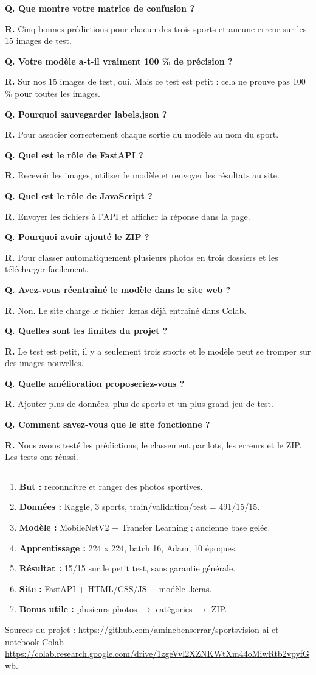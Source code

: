 \documentclass[10pt,a4paper]{article}
\newcommand{\partie}[1]{\vspace{6pt}{\large\bfseries\color{vert}#1}\par\vspace{2pt}\hrule\vspace{4pt}}
\newcommand{\qa}[2]{\textbf{Q. #1}\par \textbf{R.} #2\par\vspace{4pt}}
\begin{document}
\qa{Que montre votre matrice de confusion ?}{Cinq bonnes prédictions pour chacun des trois sports et aucune erreur sur les 15 images de test.}
\qa{Votre modèle a-t-il vraiment 100 \% de précision ?}{Sur nos 15 images de test, oui. Mais ce test est petit : cela ne prouve pas 100 \% pour toutes les images.}
\qa{Pourquoi sauvegarder labels.json ?}{Pour associer correctement chaque sortie du modèle au nom du sport.}
\qa{Quel est le rôle de FastAPI ?}{Recevoir les images, utiliser le modèle et renvoyer les résultats au site.}
\qa{Quel est le rôle de JavaScript ?}{Envoyer les fichiers à l'API et afficher la réponse dans la page.}
\qa{Pourquoi avoir ajouté le ZIP ?}{Pour classer automatiquement plusieurs photos en trois dossiers et les télécharger facilement.}
\qa{Avez-vous réentraîné le modèle dans le site web ?}{Non. Le site charge le fichier .keras déjà entraîné dans Colab.}
\qa{Quelles sont les limites du projet ?}{Le test est petit, il y a seulement trois sports et le modèle peut se tromper sur des images nouvelles.}
\qa{Quelle amélioration proposeriez-vous ?}{Ajouter plus de données, plus de sports et un plus grand jeu de test.}
\qa{Comment savez-vous que le site fonctionne ?}{Nous avons testé les prédictions, le classement par lots, les erreurs et le ZIP. Les tests ont réussi.}

\partie{6. Les sept idées à retenir}
\begin{enumerate}[leftmargin=*,itemsep=1pt]
\item \textbf{But :} reconnaître et ranger des photos sportives.
\item \textbf{Données :} Kaggle, 3 sports, train/validation/test = 491/15/15.
\item \textbf{Modèle :} MobileNetV2 + Transfer Learning ; ancienne base gelée.
\item \textbf{Apprentissage :} 224 x 224, batch 16, Adam, 10 époques.
\item \textbf{Résultat :} 15/15 sur le petit test, sans garantie générale.
\item \textbf{Site :} FastAPI + HTML/CSS/JS + modèle .keras.
\item \textbf{Bonus utile :} plusieurs photos $\to$ catégories $\to$ ZIP.
\end{enumerate}
\medskip
{\small\color{gris}Sources du projet : \url{https://github.com/aminebenserrar/sportsvision-ai} et notebook Colab \url{https://colab.research.google.com/drive/1zgeVvl2XZNKWtXm44oMiwRtb2vpyfGwb}.}
\end{document}

